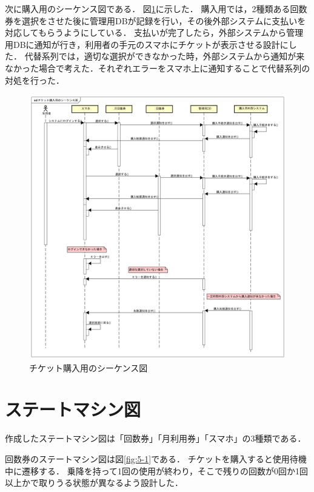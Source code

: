 \documentclass[documentclass]{jsarticle}
\begin{document}
次に購入用のシーケンス図である．
図\ref*{fig:4-3}に示した．
購入用では，2種類ある回数券を選択をさせた後に管理用DBが記録を行い，その後外部システムに支払いを対応してもらうようにしている．
支払いが完了したら，外部システムから管理用DBに通知が行き，利用者の手元のスマホにチケットが表示させる設計にした．
代替系列では，適切な選択ができなかった時，外部システムから通知が来なかった場合で考えた．それぞれエラーをスマホ上に通知することで代替系列の対処を行った．
\begin{figure}[h]
  \begin{center}
    \includegraphics*[scale=0.4]{figure/4-3.png}
  \end{center}
  \caption{チケット購入用のシーケンス図}
  \label{fig:4-3}
\end{figure}

\newpage

\section{ステートマシン図}
作成したステートマシン図は「回数券」「月利用券」「スマホ」の3種類である．

回数券のステートマシン図は図\ref*{fig:5-1}である．
チケットを購入すると使用待機中に遷移する．
乗降を持って1回の使用が終わり，そこで残りの回数が0回か1回以上かで取りうる状態が異なるよう設計した．
\end{document}
